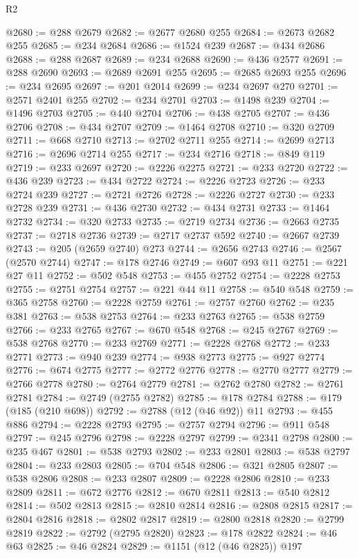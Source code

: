 \begin{lexlean}{R2}
\begin{coremodule}
@2680 := @288 @2679
@2682 := @2677 @2680 @255
@2684 := @2673 @2682 @255
@2685 := @234 @2684
@2686 := @1524 @239
@2687 := @434 @2686
@2688 := @288 @2687
@2689 := @234 @2688
@2690 := @436 @2577
@2691 := @288 @2690
@2693 := @2689 @2691 @255
@2695 := @2685 @2693 @255
@2696 := @234 @2695
@2697 := @201 @2014
@2699 := @234 @2697 @270
@2701 := @2571 @2401 @255
@2702 := @234 @2701
@2703 := @1498 @239
@2704 := @1496 @2703
@2705 := @440 @2704
@2706 := @438 @2705
@2707 := @436 @2706
@2708 := @434 @2707
@2709 := @1464 @2708
@2710 := @320 @2709
@2711 := @668 @2710
@2713 := @2702 @2711 @255
@2714 := @2699 @2713
@2716 := @2696 @2714 @255
@2717 := @234 @2716
@2718 := @849 @119
@2719 := @233 @2697
@2720 := @2226 @2275
@2721 := @233 @2720
@2722 := @436 @239
@2723 := @434 @2722
@2724 := @2226 @2723
@2726 := @233 @2724 @239
@2727 := @2721 @2726
@2728 := @2226 @2727
@2730 := @233 @2728 @239
@2731 := @436 @2730
@2732 := @434 @2731
@2733 := @1464 @2732
@2734 := @320 @2733
@2735 := @2719 @2734
@2736 := @2663 @2735
@2737 := @2718 @2736
@2739 := @2717 @2737 @592
@2740 := @2667 @2739
@2743 := @205 (@2659 @2740) @273
@2744 := @2656 @2743
@2746 := @2567 (@2570 @2744)
@2747 := @178 @2746
@2749 := @607 @93 @11
@2751 := @221 @27 @11
@2752 := @502 @548
@2753 := @455 @2752
@2754 := @2228 @2753
@2755 := @2751 @2754
@2757 := @221 @44 @11
@2758 := @540 @548
@2759 := @365 @2758
@2760 := @2228 @2759
@2761 := @2757 @2760
@2762 := @235 @381
@2763 := @538 @2753
@2764 := @233 @2763
@2765 := @538 @2759
@2766 := @233 @2765
@2767 := @670 @548
@2768 := @245 @2767
@2769 := @538 @2768
@2770 := @233 @2769
@2771 := @2228 @2768
@2772 := @233 @2771
@2773 := @940 @239
@2774 := @938 @2773
@2775 := @927 @2774
@2776 := @674 @2775
@2777 := @2772 @2776
@2778 := @2770 @2777
@2779 := @2766 @2778
@2780 := @2764 @2779
@2781 := @2762 @2780
@2782 := @2761 @2781
@2784 := @2749 (@2755 @2782)
@2785 := @178 @2784
@2788 := @179 (@185 (@210 @698))
@2792 := @2788 (@12 (@46 @92)) @11
@2793 := @455 @886
@2794 := @2228 @2793
@2795 := @2757 @2794
@2796 := @911 @548
@2797 := @245 @2796
@2798 := @2228 @2797
@2799 := @2341 @2798
@2800 := @235 @467
@2801 := @538 @2793
@2802 := @233 @2801
@2803 := @538 @2797
@2804 := @233 @2803
@2805 := @704 @548
@2806 := @321 @2805
@2807 := @538 @2806
@2808 := @233 @2807
@2809 := @2228 @2806
@2810 := @233 @2809
@2811 := @672 @2776
@2812 := @670 @2811
@2813 := @540 @2812
@2814 := @502 @2813
@2815 := @2810 @2814
@2816 := @2808 @2815
@2817 := @2804 @2816
@2818 := @2802 @2817
@2819 := @2800 @2818
@2820 := @2799 @2819
@2822 := @2792 (@2795 @2820)
@2823 := @178 @2822
@2824 := @46 @63
@2825 := @46 @2824
@2829 := @1151 (@12 (@46 @2825)) @197

\end{coremodule}
\end{lexlean}
